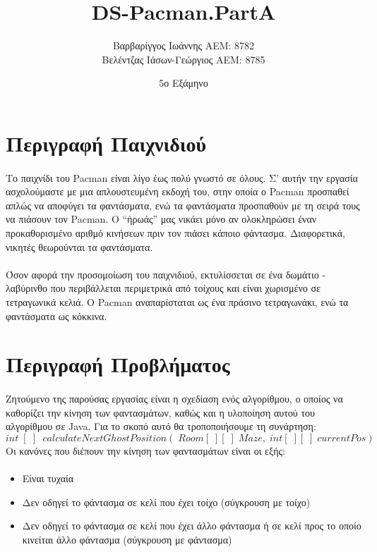 \documentclass[12pt,a4paper]{article}
\author{Βαρβαρίγγος Ιωάννης ΑΕΜ: 8782 \\ Βελέντζας Ιάσων-Γεώργιος ΑΕΜ: 8785}
\title{\lt DS-Pacman.PartA}
\date{5ο Εξάμηνο}
\newcommand{\lt}{\latintext}
\begin{document}
	
	\maketitle
		\thispagestyle{empty}
	\newpage
	\tableofcontents
	\newpage
	\section{Περιγραφή Παιχνιδιού}
\paragraph*{}
 Το παιχνίδι του {\lt Pacman} είναι λίγο έως πολύ γνωστό σε όλους. Σ’ αυτήν την εργασία ασχολούμαστε με μια απλουστευμένη εκδοχή του, στην οποία ο {\lt Pacman} προσπαθεί απλώς να αποφύγει τα φαντάσματα, ενώ τα φαντάσματα προσπαθούν με τη σειρά τους να πιάσουν τον {\lt Pacman}. Ο “ήρωάς” μας νικάει μόνο αν ολοκληρώσει έναν προκαθορισμένο αριθμό κινήσεων πριν τον πιάσει κάποιο φάντασμα. Διαφορετικά, νικητές θεωρούνται τα φαντάσματα. \paragraph*{}
	  Όσον αφορά την προσομοίωση του παιχνιδιού, εκτυλίσσεται σε ένα δωμάτιο - λαβύρινθο που περιβάλλεται περιμετρικά από τοίχους και είναι χωρισμένο σε τετραγωνικά κελιά. Ο {\lt Pacman} αναπαρίσταται ως ένα πράσινο τετραγωνάκι, ενώ τα φαντάσματα ως κόκκινα.
	\section{Περιγραφή Προβλήματος}
	\paragraph*{}
	Ζητούμενο της παρούσας εργασίας είναι η σχεδίαση ενός αλγορίθμου, ο οποίος να καθορίζει την κίνηση των φαντασμάτων, καθώς και η υλοποίηση αυτού του αλγορίθμου σε {\lt Java}. Για το σκοπό αυτό θα τροποποιήσουμε τη συνάρτηση:
	\begin{equation*}
	int\;[ \;] \; \; calculateNextGhostPosition( \; Room[\;][\;] \; Maze,\;int[\;][\;]\; currentPos)
	\end{equation*}
	Οι κανόνες που διέπουν την κίνηση των φαντασμάτων είναι οι εξής:
	\paragraph*{}
	\begin{itemize}
	
		\item Είναι τυχαία
		\item Δεν οδηγεί το φάντασμα σε κελί που έχει τοίχο (σύγκρουση με τοίχο)
		\item Δεν οδηγεί το φάντασμα σε κελί που έχει άλλο φάντασμα ή σε κελί προς το οποίο κινείται άλλο φάντασμα (σύγκρουση με φάντασμα)
	\end{itemize}
\end{document}
